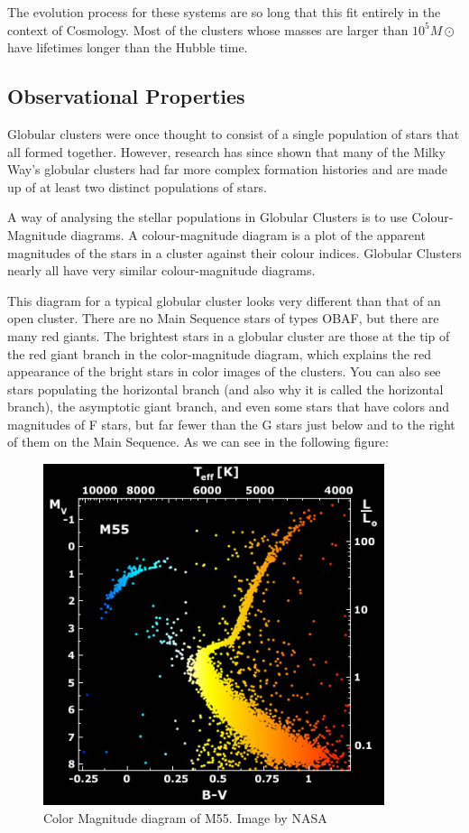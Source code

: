 The evolution process for these systems are so long that this fit entirely in the context of Cosmology. Most of the clusters whose masses are larger than $10^{5}M\odot$ have lifetimes longer than the Hubble time.

\subsection{Observational Properties}

Globular clusters were once thought to consist of a single population of stars that all formed together. However, research has since shown that many of the Milky Way's globular clusters had far more complex formation histories and are made up of at least two distinct populations of stars.

A way of analysing the stellar populations in Globular Clusters is to use Colour-Magnitude diagrams. A colour-magnitude diagram is a plot of the apparent magnitudes of the stars in a cluster against their colour indices. Globular Clusters nearly all have very similar colour-magnitude diagrams.

This diagram for a typical globular cluster looks very different than that of an open cluster. There are no Main Sequence stars of types OBAF, but there are many red giants. The brightest stars in a globular cluster are those at the tip of the red giant branch in the color-magnitude diagram, which explains the red appearance of the bright stars in color images of the clusters. You can also see stars populating the horizontal branch (and also why it is called the horizontal branch), the asymptotic giant branch, and even some stars that have colors and magnitudes of F stars, but far fewer than the G stars just below and to the right of them on the Main Sequence. As we can see in the following figure:

\begin{figure}[H]
\centering
\includegraphics[width=10cm]{images/m55_diagram.jpg}
\caption[Color Magnitude diagram of M55]{Color Magnitude diagram of M55. Image by NASA}
\end{figure}
 
